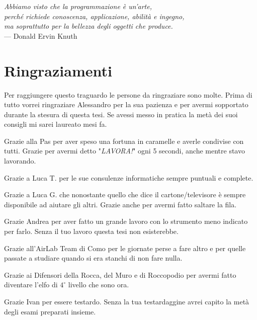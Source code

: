 \cleardoublepage
{}
{}

\begin{flushright}{\slshape    
	Abbiamo visto che la programmazione è un'arte, \\
	perché richiede conoscenza, applicazione, abilità e ingegno, \\
	ma soprattutto per la bellezza degli oggetti che produce.} \\ \medskip
    --- Donald Ervin Knuth
\end{flushright}


\bigskip

\begingroup
\let\clearpage\relax
\let\cleardoublepage\relax
\let\cleardoublepage\relax

\chapter*{Ringraziamenti}
Per raggiungere questo traguardo le persone da ringraziare sono molte. Prima di tutto
vorrei ringraziare Alessandro per la sua pazienza e per avermi sopportato durante
la stesura di questa tesi. Se avessi messo in pratica la metà dei suoi consigli
mi sarei laureato mesi fa.

Grazie alla Pas per aver speso una fortuna in caramelle e averle condivise con
tutti. Grazie per avermi detto "\emph{LAVORA!}" ogni 5 secondi, anche mentre
stavo lavorando.

Grazie a Luca T. per le sue consulenze informatiche sempre puntuali
e complete.

Grazie a Luca G. che nonostante quello che dice il cartone/televisore è sempre
disponibile ad aiutare gli altri. Grazie anche per avermi fatto saltare la fila.

Grazie Andrea per aver fatto un grande lavoro con lo strumento meno indicato
per farlo. Senza il tuo lavoro questa tesi non esisterebbe.

Grazie all'AirLab Team di Como per le giornate perse a fare altro e per quelle
passate a studiare quando si era stanchi di non fare nulla.

Grazie ai Difensori della Rocca, del Muro e di Roccopodio per avermi fatto
diventare l'elfo di $4^{\circ}$ livello che sono ora.

Grazie Ivan per essere testardo. Senza la tua testardaggine avrei capito la
metà degli esami preparati insieme.

